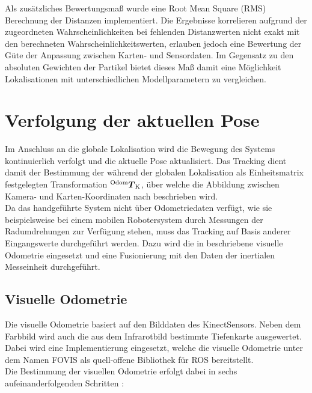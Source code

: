 Als zusätzliches Bewertungsmaß wurde eine Root Mean Square (RMS) Berechnung der Distanzen implementiert. Die Ergebnisse korrelieren aufgrund der zugeordneten Wahrscheinlichkeiten bei fehlenden Distanzwerten nicht exakt mit den berechneten Wahrscheinlichkeitswerten, erlauben jedoch eine Bewertung der Güte der Anpassung zwischen Karten- und Sensordaten. Im Gegensatz zu den absoluten Gewichten der Partikel bietet dieses Maß damit eine Möglichkeit Lokalisationen mit unterschiedlichen Modellparametern zu vergleichen.\\



\section{Verfolgung der aktuellen Pose}
\label{locloc}
Im Anschluss an die globale Lokalisation wird die Bewegung des Systems kontinuierlich verfolgt und die aktuelle Pose aktualisiert. Das Tracking dient damit der Bestimmung der während der globalen Lokalisation als Einheitsmatrix festgelegten Transformation ${^{\mathrm{Odom}}\mbox{\boldmath{$T$}}_{\mathrm{K}}}$, über welche die Abbildung zwischen Kamera- und Karten-Koordinaten nach  beschrieben wird.\\

Da das handgeführte System nicht über Odometriedaten verfügt, wie sie beispielsweise bei einem mobilen Robotersystem durch Messungen der Radumdrehungen zur Verfügung stehen, muss das Tracking auf Basis anderer Eingangswerte durchgeführt werden. Dazu wird die in  beschriebene visuelle Odometrie eingesetzt und eine Fusionierung mit den Daten der inertialen Messeinheit durchgeführt.\\

\subsection{Visuelle Odometrie}
Die visuelle Odometrie basiert auf den Bilddaten des Kinect\red[TM] Sensors. Neben dem Farbbild wird auch die aus dem Infrarotbild bestimmte Tiefenkarte ausgewertet. Dabei wird eine Implementierung \cite{Fovis} eingesetzt, welche die visuelle Odometrie unter dem Namen FOVIS als quell-offene Bibliothek für ROS bereitstellt.\\
Die Bestimmung der visuellen Odometrie erfolgt dabei in sechs aufeinanderfolgenden Schritten \cite{Huang2011}:


